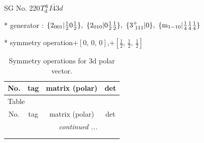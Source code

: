 \documentclass[fleqn,8pt]{jsarticle}
\begin{document}
\setcounter{MaxMatrixCols}{32}

\renewcommand{\tablename}{Table~}
\renewcommand{\figurename}{Figure~}
\begin{center}
\LARGE
SG No. 220\quad$T_{\rm d}^{6}$\quad$I\bar{4}3d$\quad[ cubic ]
\end{center}

* generator : $\{2{}_{001}|\frac{1}{2} 0 \frac{1}{2}\},\,\,\{2{}_{010}|0 \frac{1}{2} \frac{1}{2}\},\,\,\{3^{+}_{\,\,111}|0\},\,\,\{{\rm m}_{1-10}|\frac{1}{4} \frac{1}{4} \frac{1}{4}\}$

* symmetry operation\quad$+\left[ 0,\, 0,\, 0 \right]$,\quad $+\left[ \frac{1}{2},\, \frac{1}{2},\, \frac{1}{2} \right]$
\renewcommand{\arraystretch}{1.3}
\begin{longtable}{cccc}
\caption{Symmetry operations for 3d polar vector.}
 \\
 \hline \hline
No. & tag & matrix (polar) & det \\ \hline \endfirsthead

\multicolumn{3}{l}{\tablename\ \thetable{}} \\
 \hline \hline
No. & tag & matrix (polar) & det \\ \hline \endhead

 \hline \hline
\multicolumn{3}{r}{\footnotesize\it continued ...} \\ \endfoot

 \hline \hline
\multicolumn{3}{r}{} \\ \endlastfoot


\end{longtable}
\end{document}

